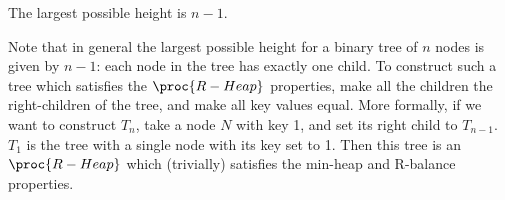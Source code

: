 \documentclass[11pt, answers]{exam}
\theoremstyle{plain}
\theoremstyle{definition}
\begin{document}
\begin{questions}
\begin{parts}
\begin{solution}
The largest possible height is $n-1$.

Note that in general the largest possible height for a binary tree of $n$ nodes is given by $n-1$: each node in the tree has exactly one child. To construct such a tree which satisfies the $\proc{R-Heap}$ properties, make all the children the right-children of the tree, and make all key values equal. More formally, if we want to construct $T_n$, take a node $N$ with key 1, and set its right child to $T_{n-1}$. $T_1$ is the tree with a single node with its key set to 1. Then this tree is an $\proc{R-Heap}$ which (trivially) satisfies the min-heap and R-balance properties.



\end{solution}


\end{parts}
\end{questions}

 
\end{document}
